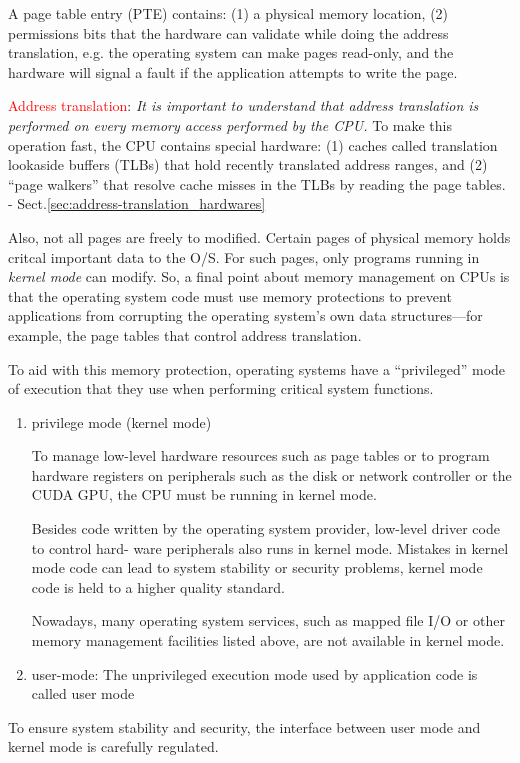 \begin{mdframed}
A page table entry (PTE) contains:
(1) a physical memory location, (2) permissions bits that the hardware can
validate while doing the address translation, e.g.
the operating system can make pages read-only, and the hardware will signal a
fault if the application attempts to write the page.


\textcolor{red}{Address translation}: {\it It is important to understand that
address translation is performed on every memory access performed by the CPU.}
To make this operation fast, the CPU contains special hardware: (1) caches
called translation lookaside buffers (TLBs) that hold recently translated
address ranges, and (2) “page walkers” that resolve cache misses in the TLBs by
reading the page tables. - Sect.\ref{sec:address-translation_hardwares}

\end{mdframed}


Also, not all pages are freely to modified. Certain pages of physical memory
holds critcal important data to the O/S.
For such pages, only programs running in {\it kernel mode} can modify.
So, a final point about memory management on CPUs is that the operating system
code must use memory protections to prevent applications from corrupting the
operating system’s own data structures—for example, the page tables that control
address translation.

To aid with this memory protection, operating systems have a “privileged” mode
of execution that they use when performing critical system functions.
\begin{enumerate}
  \item privilege mode (kernel mode)
  
  To manage low-level hardware resources such as page tables or to program
  hardware registers on peripherals such as the disk or network controller or
  the CUDA GPU, the CPU must be running in kernel mode.
  
  Besides code written by the operating system provider, low-level driver code to control hard- ware peripherals also runs in kernel mode.
  Mistakes in kernel mode code can lead to system stability or security problems, kernel mode code is held to a higher quality standard.
  
  Nowadays, many operating system services, such as mapped file I/O or other memory
  management facilities listed above, are not available in kernel mode.
  
  
  \item user-mode:
  The unprivileged execution mode used by application code is called user mode
  
\end{enumerate}
To ensure system stability and security, the interface between user mode and kernel mode is carefully regulated.

